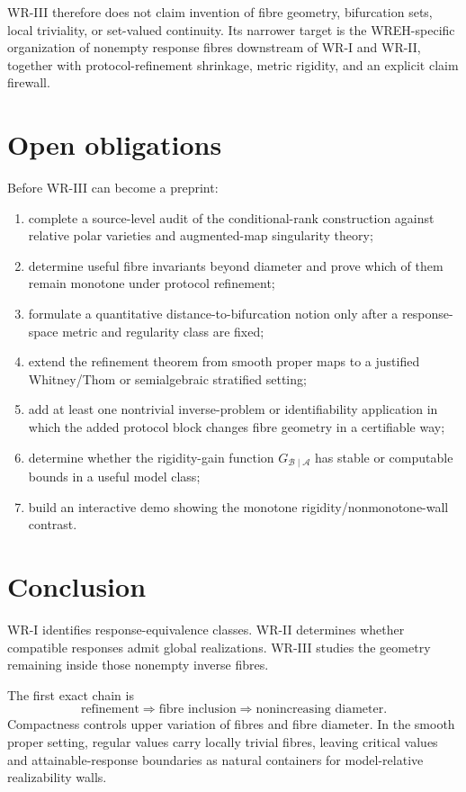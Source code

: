 \documentclass[11pt]{article}
\newcommand{\Acal}{\mathcal A}
\newcommand{\Bcal}{\mathcal B}
\begin{document}
WR-III therefore does not claim invention of fibre geometry, bifurcation
sets, local triviality, or set-valued continuity. Its narrower target is the
WREH-specific organization of nonempty response fibres downstream of WR-I and
WR-II, together with protocol-refinement shrinkage, metric rigidity, and an
explicit claim firewall.

\section{Open obligations}

Before WR-III can become a preprint:

\begin{enumerate}
\item complete a source-level audit of the conditional-rank construction
against relative polar varieties and augmented-map singularity theory;
\item determine useful fibre invariants beyond diameter and prove which of
them remain monotone under protocol refinement;
\item formulate a quantitative distance-to-bifurcation notion only after a
response-space metric and regularity class are fixed;
\item extend the refinement theorem from smooth proper maps to a justified
Whitney/Thom or semialgebraic stratified setting;
\item add at least one nontrivial inverse-problem or identifiability
application in which the added protocol block changes fibre geometry in a
certifiable way;
\item determine whether the rigidity-gain function
\(G_{\Bcal\mid\Acal}\) has stable or computable bounds in a useful model
class;
\item build an interactive demo showing the monotone rigidity/nonmonotone-wall
contrast.
\end{enumerate}

\section*{Conclusion}

WR-I identifies response-equivalence classes. WR-II determines whether
compatible responses admit global realizations. WR-III studies the geometry
remaining inside those nonempty inverse fibres.

The first exact chain is
\[
\text{refinement}
\Longrightarrow
\text{fibre inclusion}
\Longrightarrow
\text{nonincreasing diameter}.
\]
Compactness controls upper variation of fibres and fibre diameter. In the
smooth proper setting, regular values carry locally trivial fibres, leaving
critical values and attainable-response boundaries as natural containers for
model-relative realizability walls.
\end{document}
